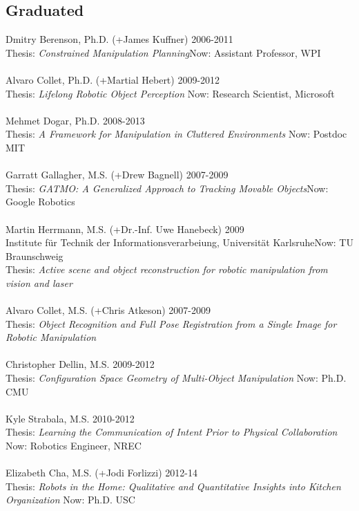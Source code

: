 \documentclass[10pt]{article}
\begin{document}
\subsection{Graduated}
\noindent
Dmitry Berenson, Ph.D. (+James Kuffner) \hfill 2006-2011\\
Thesis: \textit{Constrained Manipulation Planning}\hfill Now: Assistant Professor, WPI\\
\\
Alvaro Collet, Ph.D. (+Martial Hebert) \hfill 2009-2012\\
Thesis: \textit{Lifelong Robotic Object Perception} \hfill Now: Research Scientist, Microsoft\\
\\
Mehmet Dogar, Ph.D. \hfill 2008-2013\\
Thesis: \textit{A Framework for Manipulation in Cluttered Environments} \hfill Now: Postdoc MIT\\
\\
Garratt Gallagher, M.S. (+Drew Bagnell) \hfill 2007-2009\\ 
Thesis: \textit{GATMO: A Generalized Approach to Tracking Movable Objects}\hfill Now: Google Robotics\\
\\
Martin Herrmann, M.S. (+Dr.-Inf. Uwe Hanebeck) \hfill 2009\\
Institute f\"ur Technik der Informationsverarbeiung, Universit\"at Karlsruhe\hfill Now: TU Braunschweig\\
Thesis: \textit{Active scene and object reconstruction for robotic manipulation from vision and laser}\\
\\
Alvaro Collet, M.S. (+Chris Atkeson) \hfill 2007-2009\\
Thesis: \textit{Object Recognition and Full Pose Registration from a Single Image for Robotic Manipulation}\\
\\
Christopher Dellin, M.S. \hfill 2009-2012\\
Thesis: \textit{Configuration Space Geometry of Multi-Object Manipulation} \hfill Now: Ph.D. CMU\\
\\
Kyle Strabala, M.S. \hfill 2010-2012\\
Thesis: \textit{Learning the Communication of Intent Prior to Physical Collaboration} \hfill Now: Robotics Engineer, NREC\\
\\
Elizabeth Cha, M.S. (+Jodi Forlizzi)  \hfill 2012-14\\
Thesis: \textit{Robots in the Home: Qualitative and Quantitative Insights into Kitchen Organization} \hfill Now: Ph.D. USC\\
\end{document}

